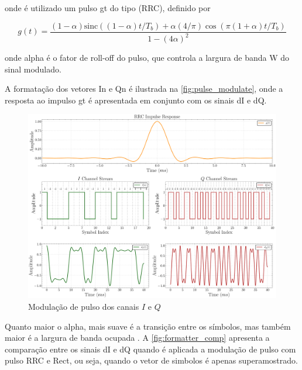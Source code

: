 \noindent onde é utilizado um pulso \gls{gt} do tipo (\gls{RRC}), definido por

\begin{equation}
    g(t) = \frac{(1-\alpha) \text{sinc}((1- \alpha) t / T_b) + \alpha(4/\pi) \cos(\pi(1 + \alpha)t/T_b) }{1 - (4\alpha )^2}
\end{equation}

\noindent onde \gls{alpha} é o fator de roll-off do pulso, que controla a largura de banda \gls{W} do sinal modulado. 

A formatação dos vetores \gls{In} e \gls{Qn} é ilustrada na \autoref{fig:pulse_modulate}, onde a resposta ao impulso \gls{gt} é apresentada em conjunto com os sinais \gls{dI} e \gls{dQ}. 

\begin{figure}[H]
	\caption{Modulação de pulso dos canais $I$ e $Q$}\label{fig:pulse_modulate}
	\includegraphics[width=\linewidth]{assets/cap2/example_formatter_comp_rrc.pdf}
\end{figure}

Quanto maior o \gls{alpha}, mais suave é a transição entre os símbolos, mas também maior é a largura de banda ocupada \cite{10555531840}. A \autoref{fig:formatter_comp} apresenta a comparação entre os sinais \gls{dI} e \gls{dQ} quando é aplicada a modulação de pulso com pulso \gls{RRC} e \gls{Rect}, ou seja, quando o vetor de simbolos é apenas superamostrado. 

